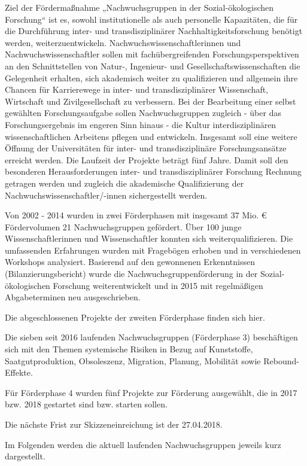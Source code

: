 Ziel der Fördermaßnahme „Nachwuchsgruppen in der Sozial-ökologischen Forschung“ ist es, sowohl institutionelle als auch personelle Kapazitäten, die für die Durchführung inter- und transdisziplinärer Nachhaltigkeitsforschung benötigt werden, weiterzuentwickeln. Nachwuchswissenschaftlerinnen und Nachwuchswissenschaftler sollen mit fachübergreifenden Forschungsperspektiven an den Schnittstellen von Natur-, Ingenieur- und Gesellschaftswissenschaften die Gelegenheit erhalten, sich akademisch weiter zu qualifizieren und allgemein ihre Chancen für Karrierewege in inter- und transdisziplinärer Wissenschaft, Wirtschaft und Zivilgesellschaft zu verbessern. Bei der Bearbeitung einer selbst gewählten Forschungsaufgabe sollen Nachwuchsgruppen zugleich - über das Forschungsergebnis im engeren Sinn hinaus - die Kultur interdisziplinären wissenschaftlichen Arbeitens pflegen und entwickeln. Insgesamt soll eine weitere Öffnung der Universitäten für inter- und transdisziplinäre Forschungsansätze erreicht werden.
Die Laufzeit der Projekte beträgt fünf Jahre. Damit soll den besonderen Herausforderungen inter- und transdisziplinärer Forschung Rechnung getragen werden und zugleich die akademische Qualifizierung der Nachwuchswissenschaftler/-innen sichergestellt werden.

Von 2002 - 2014 wurden in zwei Förderphasen mit insgesamt 37 Mio. € Fördervolumen 21 Nachwuchsgruppen gefördert. Über 100 junge Wissenschaftlerinnen und Wissenschaftler konnten sich weiterqualifizieren. Die umfassenden Erfahrungen wurden mit Fragebögen erhoben und in verschiedenen Workshops analysiert. Basierend auf den gewonnenen Erkenntnissen (Bilanzierungsbericht) wurde die Nachwuchsgruppenförderung in der Sozial-ökologischen Forschung weiterentwickelt und in 2015 mit regelmäßigen Abgabeterminen neu ausgeschrieben.

Die abgeschlossenen Projekte der zweiten Förderphase finden sich hier.

Die sieben seit 2016 laufenden Nachwuchsgruppen (Förderphase 3) beschäftigen sich mit den Themen systemische Risiken in Bezug auf Kunststoffe, Saatgutproduktion, Obsoleszenz, Migration, Planung, Mobilität sowie Rebound-Effekte.

Für Förderphase 4 wurden fünf Projekte zur Förderung ausgewählt, die in 2017 bzw. 2018 gestartet sind bzw. starten sollen.

Die nächste Frist zur Skizzeneinreichung ist der 27.04.2018.

Im Folgenden werden die aktuell laufenden Nachwuchsgruppen jeweils kurz dargestellt.

